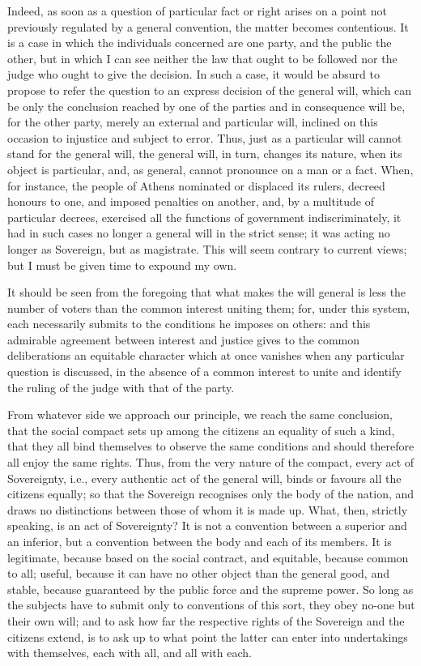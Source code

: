\documentclass[12pt]{book}
\begin{document}
Indeed, as soon as a question of particular fact or right arises on a point not previously regulated by a general convention, the matter becomes contentious. It is a case in which the individuals concerned are one party, and the public the other, but in which I can see neither the law that ought to be followed nor the judge who ought to give the decision. In such a case, it would be absurd to propose to refer the question to an express decision of the general will, which can be only the conclusion reached by one of the parties and in consequence will be, for the other party, merely an external and particular will, inclined on this occasion to injustice and subject to error. Thus, just as a particular will cannot stand for the general will, the general will, in turn, changes its nature, when its object is particular, and, as general, cannot pronounce on a man or a fact. When, for instance, the people of Athens nominated or displaced its rulers, decreed honours to one, and imposed penalties on another, and, by a multitude of particular decrees, exercised all the functions of government indiscriminately, it had in such cases no longer a general will in the strict sense; it was acting no longer as Sovereign, but as magistrate. This will seem contrary to current views; but I must be given time to expound my own.

It should be seen from the foregoing that what makes the will general is less the number of voters than the common interest uniting them; for, under this system, each necessarily submits to the conditions he imposes on others: and this admirable agreement between interest and justice gives to the common deliberations an equitable character which at once vanishes when any particular question is discussed, in the absence of a common interest to unite and identify the ruling of the judge with that of the party.

From whatever side we approach our principle, we reach the same conclusion, that the social compact sets up among the citizens an equality of such a kind, that they all bind themselves to observe the same conditions and should therefore all enjoy the same rights. Thus, from the very nature of the compact, every act of Sovereignty, i.e., every authentic act of the general will, binds or favours all the citizens equally; so that the Sovereign recognises only the body of the nation, and draws no distinctions between those of whom it is made up. What, then, strictly speaking, is an act of Sovereignty? It is not a convention between a superior and an inferior, but a convention between the body and each of its members. It is legitimate, because based on the social contract, and equitable, because common to all; useful, because it can have no other object than the general good, and stable, because guaranteed by the public force and the supreme power. So long as the subjects have to submit only to conventions of this sort, they obey no-one but their own will; and to ask how far the respective rights of the Sovereign and the citizens extend, is to ask up to what point the latter can enter into undertakings with themselves, each with all, and all with each.
\end{document}
